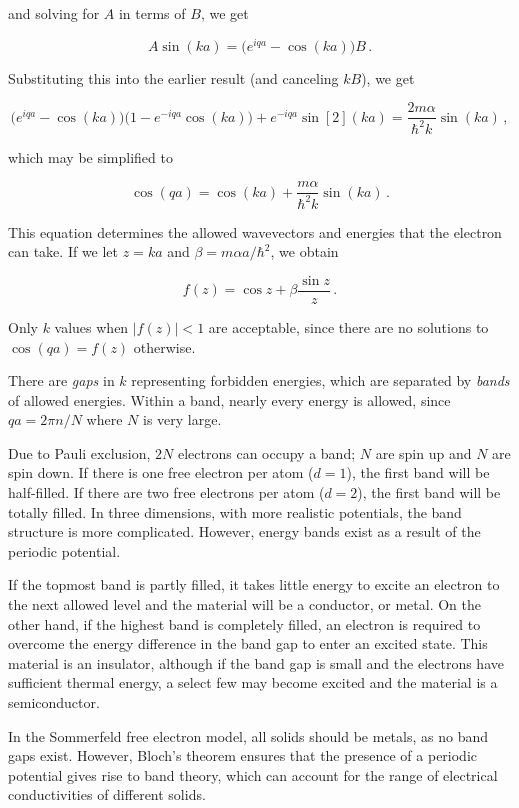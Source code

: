 \documentclass[12pt, titlepage]{article}
\begin{document}
and solving for $A$ in terms of $B$, we get

\begin{equation*}
	A\sin(ka) = \biggl(e^{iqa}-\cos(ka)\biggr)B \,.
\end{equation*}

Substituting this into the earlier result (and canceling $kB$), we get

\begin{equation*}
	\biggl(e^{iqa} - \cos(ka)\biggr)\bigg(1-e^{-iqa}\cos(ka)\bigg) + e^{-iqa}\sin[2](ka) = \frac{2m\alpha}{\hbar^2k}\sin(ka) \,,
\end{equation*}

which may be simplified to

\begin{equation}
	\cos(qa) = \cos(ka) + \frac{m\alpha}{\hbar^2k}\sin(ka) \,.
\end{equation}

This equation determines the allowed wavevectors and energies that the electron can take. If we let $z=ka$ and $\beta=m\alpha a/\hbar^2$, we obtain

\begin{equation*}
	f(z) = \cos z + \beta\frac{\sin z}{z} \,.
\end{equation*}

Only $k$ values when $|f(z)|<1$ are acceptable, since there are no solutions to $\cos(qa) = f(z)$ otherwise.



There are \textit{gaps} in $k$ representing forbidden energies, which are separated by \textit{bands} of allowed energies. Within a band, nearly every energy is allowed, since $qa = 2\pi n/N$ where $N$ is very large. 

Due to Pauli exclusion, $2N$ electrons can occupy a band; $N$ are spin up and $N$ are spin down. If there is one free electron per atom ($d=1$), the first band will be half-filled. If there are two free electrons per atom ($d=2$), the first band will be totally filled. In three dimensions, with more realistic potentials, the band structure is more complicated. However, energy bands exist as a result of the periodic potential.

If the topmost band is partly filled, it takes little energy to excite an electron to the next allowed level and the material will be a conductor, or metal. On the other hand, if the highest band is completely filled, an electron is required to overcome the energy difference in the band gap to enter an excited state. This material is an insulator, although if the band gap is small and the electrons have sufficient thermal energy, a select few may become excited and the material is a semiconductor.

In the Sommerfeld free electron model, all solids should be metals, as no band gaps exist. However, Bloch's theorem ensures that the presence of a periodic potential gives rise to band theory, which can account for the range of electrical conductivities of different solids.
\end{document}
